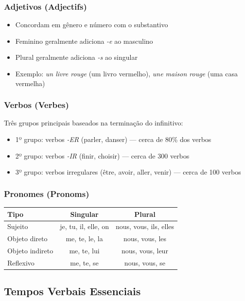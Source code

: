 \documentclass[a4paper,12pt]{article}
\begin{document}
\subsubsection{Adjetivos (Adjectifs)}
\begin{itemize}
    \item Concordam em gênero e número com o substantivo
    \item Feminino geralmente adiciona \emph{-e} ao masculino
    \item Plural geralmente adiciona \emph{-s} ao singular
    \item Exemplo: \emph{un livre rouge} (um livro vermelho), \emph{une maison rouge} (uma casa vermelha)
\end{itemize}

\subsubsection{Verbos (Verbes)}
Três grupos principais baseados na terminação do infinitivo:
\begin{itemize}
    \item 1º grupo: verbos \emph{-ER} (parler, danser) — cerca de 80\% dos verbos
    \item 2º grupo: verbos \emph{-IR} (finir, choisir) — cerca de 300 verbos
    \item 3º grupo: verbos irregulares (être, avoir, aller, venir) — cerca de 100 verbos
\end{itemize}

\subsubsection{Pronomes (Pronoms)}
\begin{tabular}{lcc}
    \toprule
    Tipo & Singular & Plural \\
    \midrule
    Sujeito & je, tu, il, elle, on & nous, vous, ils, elles \\
    Objeto direto & me, te, le, la & nous, vous, les \\
    Objeto indireto & me, te, lui & nous, vous, leur \\
    Reflexivo & me, te, se & nous, vous, se \\
    \bottomrule
\end{tabular}

\subsection{Tempos Verbais Essenciais}
\end{document}
